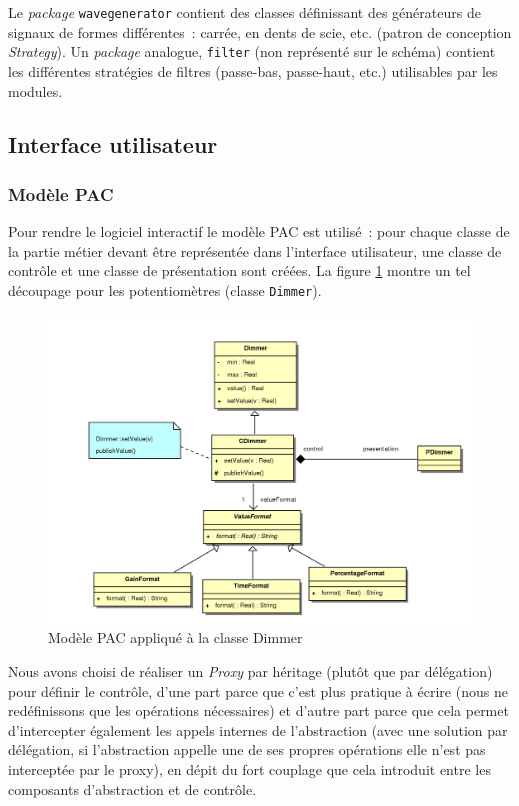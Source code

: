 Le \emph{package} \verb!wavegenerator! contient des classes
définissant des générateurs de signaux de formes différentes~:
carrée, en dents de scie, etc. (patron de conception
\emph{Strategy}). Un \emph{package} analogue, \verb!filter! (non
représenté sur le schéma) contient les différentes stratégies de
filtres (passe-bas, passe-haut, etc.) utilisables par les modules.

\subsection{Interface utilisateur}

\subsubsection{Modèle PAC}

Pour rendre le logiciel interactif le modèle PAC est utilisé~: pour
chaque classe de la partie métier devant être représentée dans
l'interface utilisateur, une classe de contrôle et une classe de
présentation sont créées. La figure \ref{pacdimmer-pim} montre un tel découpage pour
les potentiomètres (classe \verb!Dimmer!).

\begin{figure}[htb]
\centering
\includegraphics[width=16cm]{../img/ps/pacdimmer-pim.pdf}
\caption{Modèle PAC appliqué à la classe Dimmer}
\label{pacdimmer-pim}
\end{figure}

Nous avons choisi de réaliser un \emph{Proxy} par héritage (plutôt
que par délégation) pour définir le contrôle, d'une part parce que
c'est plus pratique à écrire (nous ne redéfinissons que les
opérations nécessaires) et d'autre part parce que cela permet
d'intercepter également les appels internes de l'abstraction (avec
une solution par délégation, si l'abstraction appelle une de ses
propres opérations elle n’est pas interceptée par le
proxy), en dépit du fort couplage que cela introduit entre les
composants d'abstraction et de contrôle.

